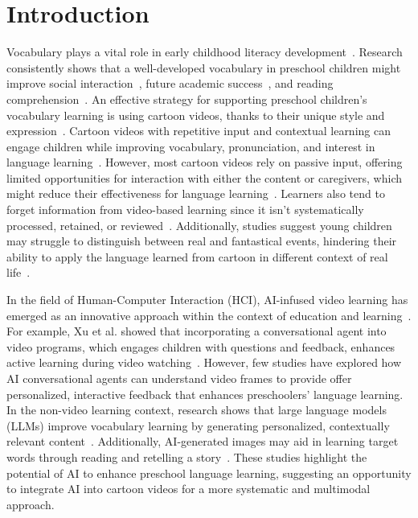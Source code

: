 \section{Introduction}
Vocabulary plays a vital role in early childhood literacy development~\cite{song2015tracing,hoffman2014assessing}.
Research consistently shows that a well-developed vocabulary in preschool children might improve social interaction~\cite{erdemir2022vocabulary}, future academic success~\cite{cox2014children}, and reading comprehension~\cite{hadley2016examining}. 
An effective strategy for supporting preschool children's vocabulary learning is using cartoon videos, thanks to their unique style and expression~\cite{Vitasmoro2019/11,meng2020influence}.
Cartoon videos with repetitive input and contextual learning can engage children while improving vocabulary, pronunciation, and interest in language learning~\cite{perween2020impact,okunolaexploring,arifani2020cartoon}.
However, most cartoon videos rely on passive input, offering limited opportunities for interaction with either the content or caregivers, which might reduce their effectiveness for language learning~\cite{10.1145/3078072.3079717,meng2020influence}.
Learners also tend to forget information from video-based learning since it isn't systematically processed, retained, or reviewed~\cite{goodianti2007learners}. 
Additionally, studies suggest young children may struggle to distinguish between real and fantastical events, hindering their ability to apply the language learned from cartoon in different context of real life~\cite{Beege2024,Prosic-Santovac2017,Vitasmoro2019/11,li2015can}.

In the field of Human-Computer Interaction (HCI), AI-infused video learning has emerged as an innovative approach within the context of education and learning~\cite{10.1145/3544548.3581153,10.1145/3544549.3585804,10.1145/3442381.3449808,10.1145/3613904.3642587}. 
For example, Xu et al. showed that incorporating a conversational agent into video programs, which engages children with questions and feedback, enhances active learning during video watching~\cite{10.1145/3491102.3502050}.
However, few studies have explored how AI conversational agents can understand video frames to provide offer personalized, interactive feedback that enhances preschoolers' language learning.
In the non-video learning context, research shows that large language models (LLMs) improve vocabulary learning by generating personalized, contextually relevant content~\cite{leong2024putting}. 
Additionally, AI-generated images may aid in learning target words through reading and retelling a story~\cite{chen2024retassist}. 
These studies highlight the potential of AI to enhance preschool language learning, suggesting an opportunity to integrate AI into cartoon videos for a more systematic and multimodal approach.

